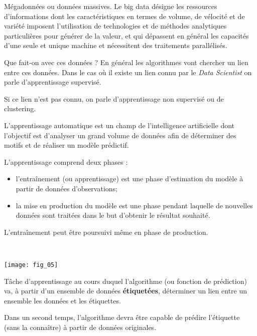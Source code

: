 \begin{defi}
Mégadonnées ou données massives. Le big data désigne les ressources d’informations dont les caractéristiques en termes de volume, de vélocité et de variété imposent l’utilisation de technologies et de méthodes analytiques particulières pour générer de la valeur, et qui dépassent en général les capacités d'une seule et unique machine et nécessitent des traitements parallélisés.
\end{defi}


Que fait-on avec ces données ? En général les algorithmes vont chercher un lien entre ces données. Dans le cas où il existe un lien connu par le \textit{Data Scientist} on parle d'apprentissage supervisé. 

Si ce lien n'est pas connu, on parle d'apprentissage non supervisé ou de clustering. 




\begin{defi}
L'apprentissage automatique est un champ de l'intelligence artificielle dont l'objectif est d'analyser un grand volume de
données afin de déterminer des motifs et de réaliser un modèle prédictif. 

L'apprentissage comprend deux phases : 
\begin{itemize}
\item l’entraînement (ou apprentissage) est une phase d'estimation du modèle à partir de données d'observations; 
\item la mise en production du modèle est une phase pendant laquelle de nouvelles données sont traitées dans le but d'obtenir le résultat souhaité. 
\end{itemize}

L’entraînement peut être poursuivi même en phase de production.

\end{defi}


\begin{exemple}~\\

\begin{center}
\texttt{[image: fig\_05]}
\end{center}
\end{exemple}


\begin{defi}
Tâche d'apprentissage au cours duquel l'algorithme (ou fonction de prédiction) va, à partir d'un ensemble de données \textbf{étiquetées}, déterminer un lien entre un ensemble les données et les étiquettes. 

Dans un second temps, l'algorithme devra être capable de prédire l'étiquette (sans la connaître) à partir de données originales.

\end{defi}



